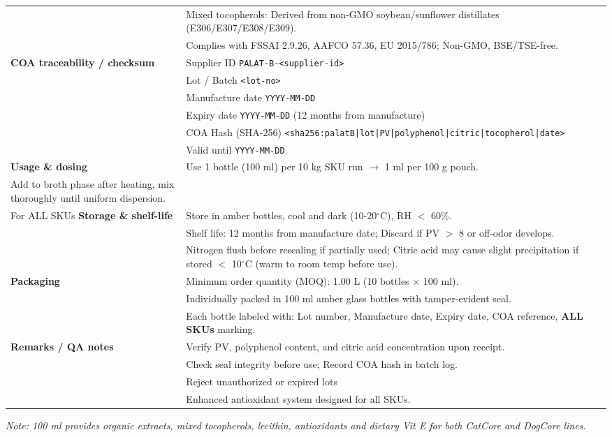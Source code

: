 \begin{adjustbox}{max width=\textwidth}
\begin{tabular}{@{}p{}p{}@{}}
& Mixed tocopherols: Derived from non-GMO soybean/sunflower distillates (E306/E307/E308/E309).\\
& Complies with FSSAI 2.9.26, AAFCO 57.36, EU 2015/786; Non-GMO, BSE/TSE-free.\\
\midrule
\textbf{COA traceability / checksum} &
Supplier ID \dotfill \texttt{PALAT-B-<supplier-id>}\\
& Lot / Batch \dotfill \texttt{<lot-no>}\\
& Manufacture date \dotfill \texttt{YYYY-MM-DD}\\
& Expiry date \dotfill \texttt{YYYY-MM-DD} (12 months from manufacture)\\
& COA Hash (SHA-256) \dotfill \texttt{<sha256:palatB|lot|PV|polyphenol|citric|tocopherol|date>}\\
& Valid until \dotfill \texttt{YYYY-MM-DD}\\
\midrule
\textbf{Usage \& dosing} &
Use 1 bottle (100 ml) per 10 kg SKU run $\rightarrow$ 1 ml per 100 g pouch.\\
Add to broth phase after heating, mix thoroughly until uniform dispersion.\\
For ALL SKUs
\midrule
\textbf{Storage \& shelf-life} &
Store in amber bottles, cool and dark (10-20$^\circ$C), RH $<$ 60\%.\\
& Shelf life: 12 months from manufacture date; Discard if PV $>$ 8 or off-odor develops.\\
& Nitrogen flush before resealing if partially used; Citric acid may cause slight precipitation if stored $<$ 10$^\circ$C (warm to room temp before use).\\
\midrule
\textbf{Packaging} &
Minimum order quantity (MOQ): 1.00 L (10 bottles $\times$ 100 ml).\\
& Individually packed in 100 ml amber glass bottles with tamper-evident seal.\\
& Each bottle labeled with: Lot number, Manufacture date, Expiry date, COA reference, \textbf{ALL SKUs} marking.\\
\midrule
\textbf{Remarks / QA notes} &
Verify PV, polyphenol content, and citric acid concentration upon receipt.\\
& Check seal integrity before use; Record COA hash in batch log.\\
& Reject unauthorized or expired lots\\
& Enhanced antioxidant system designed for all SKUs.\\
\bottomrule
\end{tabular}
\end{adjustbox}

\vspace{0.5em}
\noindent\textit{Note: 100 ml provides organic extracts, mixed tocopherols, lecithin, antioxidants and dietary Vit E for both CatCore and DogCore lines.}
\vspace{0.5em}